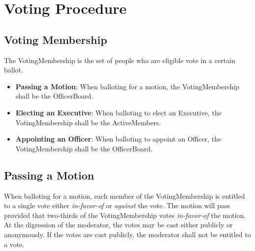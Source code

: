 \chapter{Voting Procedure}\label{Bylaw:Voting}

\section{Voting Membership}\label{Bylaw:Voting:Membership}
	The \gls{VotingMembership} is the set of people who are eligible vote in a certain ballot. 
	\begin{itemize}
		\item{\textbf{Passing a Motion}: When balloting for a motion, the \gls{VotingMembership} shall be the \gls{OfficerBoard}.}
		\item{\textbf{Electing an Executive}: When balloting to elect an \gls{Executive}, the \gls{VotingMembership} shall be the \glspl{ActiveMember}.}
		\item{\textbf{Appointing an Officer}: When balloting to appoint an \gls{Officer}, the \gls{VotingMembership} shall be the \gls{OfficerBoard}.}
	\end{itemize}

\section{Passing a Motion}\label{Bylaw:Voting:Motion}
	When balloting for a motion, each member of the \gls{VotingMembership} is entitled to a single vote  either \textit{in-favor-of} or \textit{against} the vote. The motion will pass provided that two-thirds of the \gls{VotingMembership} votes \textit{in-favor-of} the motion. At the digression of the moderator, the votes may be cast either publicly or anonymously. If the votes are cast publicly, the moderator shall not be entitled to a vote.

